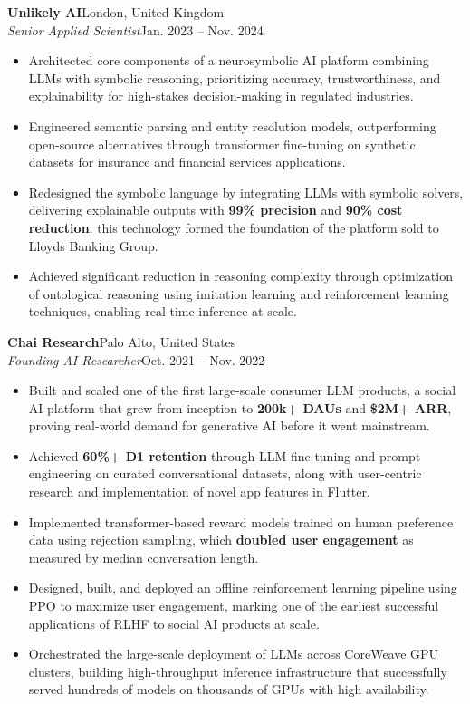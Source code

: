 \documentclass[10pt,a4paper]{article}
\newcommand{\experience}[4]{%
    \textbf{#1}\hfill #2\\
    \textit{#3}\hfill #4%
}
\begin{document}
\experience{Unlikely AI}{London, United Kingdom}
{Senior Applied Scientist}{Jan. 2023 -- Nov. 2024}
\begin{itemize}
    \item Architected core components of a neurosymbolic AI platform combining LLMs with symbolic reasoning, prioritizing accuracy, trustworthiness, and explainability for high-stakes decision-making in regulated industries.
    \item Engineered semantic parsing and entity resolution models, outperforming open-source alternatives through transformer fine-tuning on synthetic datasets for insurance and financial services applications.
    \item Redesigned the symbolic language by integrating LLMs with symbolic solvers, delivering explainable outputs with \textbf{99\% precision} and \textbf{90\% cost reduction}; this technology formed the foundation of the platform sold to Lloyds Banking Group.
    \item Achieved significant reduction in reasoning complexity through optimization of ontological reasoning using imitation learning and reinforcement learning techniques, enabling real-time inference at scale.
\end{itemize}

\experience{Chai Research}{Palo Alto, United States}
{Founding AI Researcher}{Oct. 2021 -- Nov. 2022}
\begin{itemize}
    \item Built and scaled one of the first large-scale consumer LLM products, a social AI platform that grew from inception to \textbf{200k+ DAUs} and \textbf{\$2M+ ARR}, proving real-world demand for generative AI before it went mainstream.
    \item Achieved \textbf{60\%+ D1 retention} through LLM fine-tuning and prompt engineering on curated conversational datasets, along with user-centric research and implementation of novel app features in Flutter.
    \item Implemented transformer-based reward models trained on human preference data using rejection sampling, which \textbf{doubled user engagement} as measured by median conversation length.
    \item Designed, built, and deployed an offline reinforcement learning pipeline using PPO to maximize user engagement, marking one of the earliest successful applications of RLHF to social AI products at scale.
    \item Orchestrated the large-scale deployment of LLMs across CoreWeave GPU clusters, building high-throughput inference infrastructure that successfully served hundreds of models on thousands of GPUs with high availability.
\end{itemize}
\end{document}
